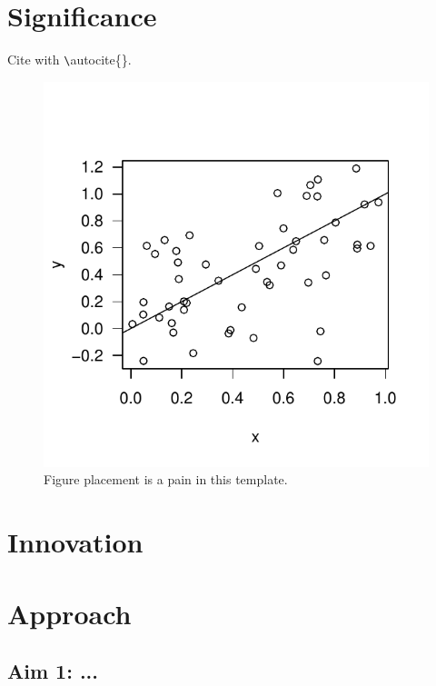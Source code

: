 \documentclass[combined.tex]{subfiles}
\begin{document}

\section{Significance}

Cite with {\texttt \textbackslash autocite\{\}}\autocite{Wilson2017}.


\begin{figure}

\vspace{-3.25em}
\begin{framed}

\vspace{-3em}

\centering
\includegraphics[width=\textwidth]{figs/myfigure.pdf}
    
\vspace{-2em}
    
\caption{Figure placement is a pain in this template.}
\label{fig:myfigure}
        
\end{framed}
\vspace{-2em}
\end{figure}

\lipsum[2-4]



\section{Innovation}



\section{Approach}

\subsection{Aim 1: ...}
\end{document}
